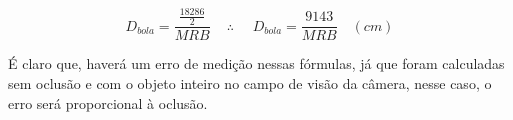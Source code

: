 \begin{equation} 
	D_{bola} = \frac {\frac {18286} {2}} {MRB} \,\,\,\,\,\,\, \therefore \,\,\,\,\,\,\,\, D_{bola} = \frac {9143} {MRB}\,\,\,\,\,\, (cm)
\end{equation}

É claro que, haverá um erro de medição nessas fórmulas, já que foram calculadas sem oclusão e com o objeto inteiro no campo de visão da câmera, nesse caso, o erro será proporcional à oclusão.

